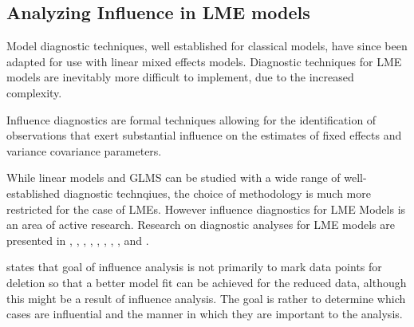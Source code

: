 \documentclass[12pt, a4paper]{report}
\theoremstyle{plain}
\theoremstyle{definition}
\theoremstyle{remark}
\begin{document}
%



\newpage
\subsection{Analyzing Influence in LME models}
Model diagnostic techniques, well established for classical models, have since been adapted for use with linear mixed effects models. Diagnostic techniques for LME models are inevitably more difficult to implement, due to the increased complexity.
	
Influence diagnostics are formal techniques allowing for the identification of observations that exert substantial  influence on the estimates of fixed effects and variance covariance parameters.

While linear models and GLMS can be studied with a wide range of well-established diagnostic technqiues, the choice of methodology is much more restricted for the case of LMEs. However influence diagnostics for LME Models is an area of active research. Research on diagnostic analyses for LME models are presented in \citet{Beckman}, 
	\citet{Christensen}, \citet{HildenMinton}, \citet{lesaffre1998local}, \citet{Banerjee1997}, 
	\citet{fung2002}, \citet{Demi}, \citet{Zewotir}, \citet{zewotir2008} and \citet{NobreSinger2007, NobreSinger2011}.
	
	
	
	
	
	\citet{schabenberger} states that goal of influence analysis is not primarily to mark data
	points for deletion so that a better model fit can be achieved for the reduced data, although this might be a
	result of influence analysis. The goal is rather to determine which cases are influential and the manner in
	which they are important to the analysis. 
	
	
	
	
\end{document}
